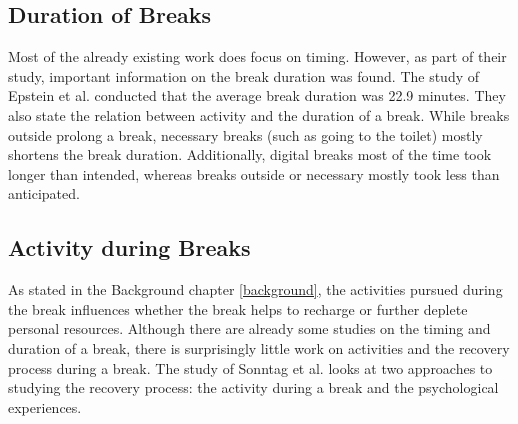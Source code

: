 \documentclass{hasel_thesis}
\begin{document}
\subsection{Duration of Breaks}

Most of the already existing work does focus on timing. However, as part of their study, important information on the break duration was found. The study of Epstein et al. \cite{epstein.2016t} conducted that the average break duration was 22.9 minutes. They also state the relation between activity and the duration of a break. While breaks outside prolong a break, necessary breaks (such as going to the toilet) mostly shortens the break duration. Additionally, digital breaks most of the time took longer than intended, whereas breaks outside or necessary mostly took less than anticipated.

\subsection{Activity during Breaks} \label{rw_activity}

As stated in the Background chapter \ref{background}, the activities pursued during the break influences whether the break helps to recharge or further deplete personal resources. Although there are already some studies on the timing and duration of a break, there is surprisingly little work on activities and the recovery process during a break. The study of Sonntag et al. \cite{Sonnentag.2022} looks at two approaches to studying the recovery process: the activity during a break and the psychological experiences.
\end{document}
